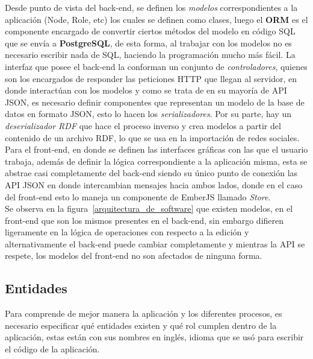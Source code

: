 Desde punto de vista del back-end, se definen los \emph{modelos} correspondientes a la aplicación (Node, Role, etc) los cuales se definen como clases, luego el \textbf{ORM} es el componente encargado de convertir ciertos métodos del modelo en código SQL que se envía a \textbf{PostgreSQL}, de esta forma, al trabajar con los modelos no es necesario escribir nada de SQL, haciendo la programación mucho más fácil. La interfaz que posee el back-end la conforman un conjunto de \emph{controladores}, quienes son los encargados de responder las peticiones HTTP que llegan al servidor, en donde interactúan con los modelos y como se trata de en su mayoría de API JSON, es necesario definir componentes que representan un modelo de la base de datos en formato JSON, esto lo hacen los \emph{serializadores}. Por su parte, hay un \emph{deserializador RDF} que hace el proceso inverso y crea modelos a partir del contenido de un archivo RDF, lo que se usa en la importación de redes sociales.\\

Para el front-end, en donde se definen las interfaces gráficas con las que el usuario trabaja, además de definir la lógica correspondiente a la aplicación misma, esta se abstrae casi completamente del back-end siendo su único punto de conexión las API JSON en donde intercambian mensajes hacia ambos lados, donde en el caso del front-end esto lo maneja un componente de EmberJS llamado \emph{Store}.\\

Se observa en la figura~\ref{arquitectura_de_software} que existen modelos, en el front-end que son los mismos presentes en el back-end, sin embargo difieren ligeramente en la lógica de operaciones con respecto a la edición y alternativamente el back-end puede cambiar completamente y mientras la API se respete, los modelos del front-end no son afectados de ninguna forma.\\

\subsection{Entidades} %
\label{sub:entidades}

Para comprende de mejor manera la aplicación y los diferentes procesos, es necesario especificar qué entidades existen y qué rol cumplen dentro de la aplicación, estas están con sus nombres en inglés, idioma que se usó para escribir el código de la aplicación.\\

